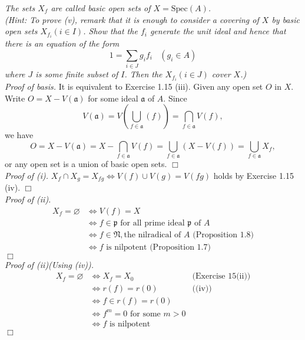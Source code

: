 \documentclass{article}
\begin{document}
\emph{The sets $X_f$ are called basic open sets of
$X = \mathrm{Spec}(A)$.} \\

\emph{(Hint: To prove (v), remark that it is enough to consider a covering of $X$
by basic open sets $X_{f_i} (i \in I)$.
Show that the $f_i$ generate the unit ideal and hence that
there is an equation of the form
$$1 = \sum_{i \in J} g_i f_i \:\:\:\: (g_i \in A)$$
where $J$ is some finite subset of $I$.
Then the $X_{f_i} (i \in J)$ cover $X$.)} \\



\emph{Proof of basis.}
It is equivalent to Exercise 1.15 (iii).
Given any open set $O$ in $X$.
Write $O = X - V(\mathfrak{a})$ for some ideal $\mathfrak{a}$ of $A$.
Since
$$V(\mathfrak{a})
= V \left( \bigcup_{f \in \mathfrak{a}} (f) \right)
= \bigcap_{f \in \mathfrak{a}} V(f),$$
we have
$$O
= X - V(\mathfrak{a})
= X - \bigcap_{f \in \mathfrak{a}} V(f)
= \bigcup_{f \in \mathfrak{a}} (X - V(f))
= \bigcup_{f \in \mathfrak{a}} X_f,$$
or any open set is a union of basic open sets.
$\Box$ \\



\emph{Proof of (i).}
$X_f \cap X_g = X_{fg} \Longleftrightarrow V(f) \cup V(g) = V(fg)$ holds by Exercise 1.15 (iv).
$\Box$ \\



\emph{Proof of (ii).}
\begin{align*}
X_f = \varnothing
&\Longleftrightarrow V(f) = X \\
&\Longleftrightarrow f \in \mathfrak{p}
\text{ for all prime ideal $\mathfrak{p}$ of $A$} \\
&\Longleftrightarrow f \in \mathfrak{N},
\text{the nilradical of $A$ (Proposition 1.8)} \\
&\Longleftrightarrow f \text{ is nilpotent (Proposition 1.7)}
\end{align*}
$\Box$ \\



\emph{Proof of (ii)(Using (iv)).}
\begin{align*}
X_f = \varnothing
&\Longleftrightarrow X_f = X_0
  &\text{(Exercise 15(ii))} \\
&\Longleftrightarrow r(f) = r(0)
  &\text{((iv))} \\
&\Longleftrightarrow f \in r(f) = r(0)
  & \\
&\Longleftrightarrow f^m = 0 \text{ for some $m > 0$}
  & \\
&\Longleftrightarrow f \text{ is nilpotent}
  &
\end{align*}
$\Box$ \\
\end{document}
